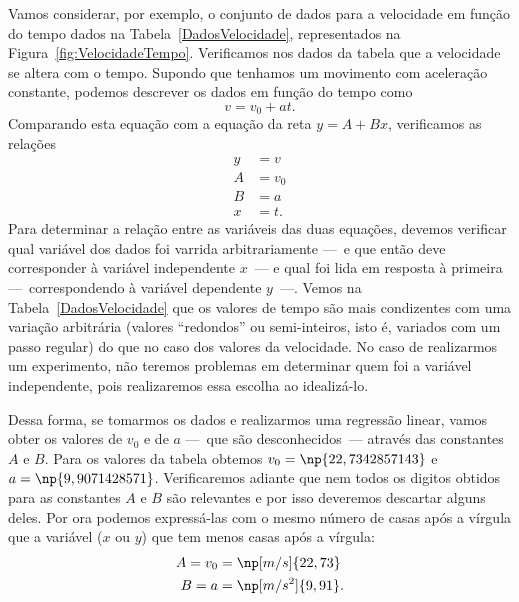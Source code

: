 Vamos considerar, por exemplo, o conjunto de dados para a velocidade em função do tempo dados na Tabela~\ref{DadosVelocidade}, representados na Figura~\ref{fig:VelocidadeTempo}. Verificamos nos dados da tabela que a velocidade se altera com o tempo. Supondo que tenhamos um movimento com aceleração constante, podemos descrever os dados em função do tempo como
\begin{equation}
	v = v_0 + at.
\end{equation}
%
Comparando esta equação com a equação da reta $y = A + Bx$, verificamos as relações
\begin{align}
	y &= v \\
	A &= v_0 \\
	B &= a \\
	x &= t.
\end{align}
%
Para determinar a relação entre as variáveis das duas equações, devemos verificar qual variável dos dados foi varrida arbitrariamente ---~e que então deve corresponder à variável independente $x$~--- e qual foi lida em resposta à primeira ---~correspondendo à variável dependente $y$~---. Vemos na Tabela~\ref{DadosVelocidade} que os valores de tempo são mais condizentes com uma variação arbitrária (valores ``redondos'' ou semi-inteiros, isto é, variados com um passo regular) do que no caso dos valores da velocidade. No caso de realizarmos um experimento, não teremos problemas em determinar quem foi a variável independente, pois realizaremos essa escolha ao idealizá-lo.

Dessa forma, se tomarmos os dados e realizarmos uma regressão linear, vamos obter os valores de $v_0$ e de $a$ ---~que são desconhecidos~--- através das constantes $A$ e $B$. Para os valores da tabela obtemos $v_0 = \np{22,734 285 714 3}$ e $a = \np{9,907 142 857 1}$. Verificaremos adiante que nem todos os digitos obtidos para as constantes $A$ e $B$ são relevantes e por isso deveremos descartar alguns deles. Por ora podemos expressá-las com o mesmo número de casas após a vírgula que a variável ($x$ ou $y$) que tem menos casas após a vírgula:
\begin{align}
	A = v_0 &= \np[m/s]{22,73} \\
	B = a &= \np[m/s^2]{9,91}.
\end{align}

\begin{figure*}[!htbt]
\centering
\caption{Gráfico dos dados da Tabela~\ref{DadosVelocidade}.} 
\label{fig:VelocidadeTempo}

\end{figure*}


